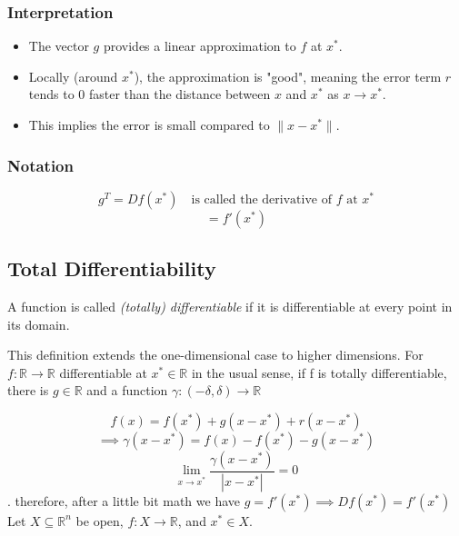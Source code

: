 \documentclass{article}
\begin{document}
\subsubsection*{Interpretation}
\begin{itemize}
    \item The vector \( g \) provides a linear approximation to \( f \) at \( x^* \).
    \item Locally (around \( x^* \)), the approximation is "good", meaning the error term \( r \) tends to 0 faster than the distance between \( x \) and \( x^* \) as \( x \to x^* \).
    \item This implies the error is small compared to \( \|x - x^*\| \).
\end{itemize}

\subsubsection*{Notation}
\[
g^T = Df(x^*) \quad \text{is called the derivative of } f \text{ at } x^*
\]
\[
= f'(x^*)
\]

\subsection*{Total Differentiability}

A function is called \textit{(totally) differentiable} if it is differentiable at every point in its domain.

This definition extends the one-dimensional case to higher dimensions. For \( f: \mathbb{R} \rightarrow \mathbb{R} \) differentiable at \( x^* \in \mathbb{R} \) in the usual sense, if f is totally differentiable, there is $g \in \mathbb{R}$ and a function $\gamma : (-\delta, \delta) \rightarrow \mathbb{R}$

\[
f(x) = f(x^*) + g(x - x^*) + r(x - x^*)
\]
\[
\implies \gamma(x - x^{*}) = f(x) - f(x^{*}) - g(x-x^{*})
\]
\[ \lim_{x \to x^*} \frac{\gamma(x - x^*)}{|x - x^*|} = 0\].
therefore, after a little bit math we have \( g = f'(x^*) \implies D f(x^{*}) = f'(x^{*})\) 
\\[5mm]
Let \( X \subseteq \mathbb{R}^n \) be open, \( f: X \rightarrow \mathbb{R} \), and \( x^* \in X \).
\end{document}
